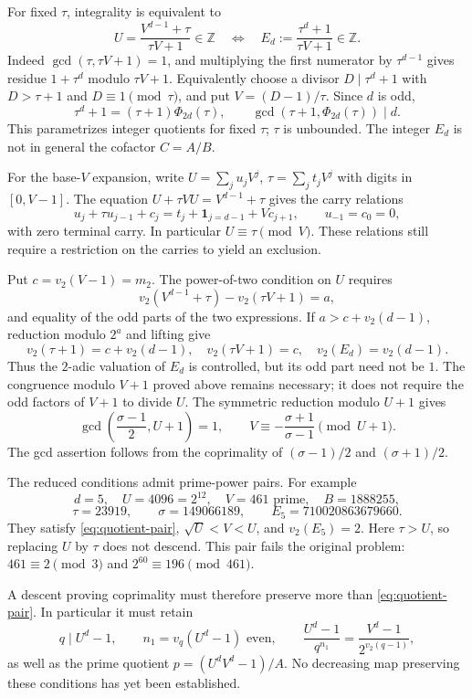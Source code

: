 \documentclass[11pt]{article}
\begin{document}
For fixed $\tau$, integrality is equivalent to
\begin{equation}\label{eq:quotient-divisor}
U=\frac{V^{d-1}+\tau}{\tau V+1}\in\mathbb Z
\quad\Longleftrightarrow\quad
E_d:=\frac{\tau^d+1}{\tau V+1}\in\mathbb Z.
\end{equation}
Indeed $\gcd(\tau,\tau V+1)=1$, and multiplying the first numerator
by $\tau^{d-1}$ gives residue $1+\tau^d$ modulo $\tau V+1$.
Equivalently choose a divisor $D\mid\tau^d+1$ with
$D>\tau+1$ and $D\equiv1\pmod\tau$, and put $V=(D-1)/\tau$.
Since $d$ is odd,
\[
\tau^d+1=(\tau+1)\Phi_{2d}(\tau),\qquad
\gcd(\tau+1,\Phi_{2d}(\tau))\mid d.
\]
This parametrizes integer quotients for fixed $\tau$; $\tau$ is unbounded.
The integer $E_d$ is not in general the cofactor $C=A/B$.

For the base-$V$ expansion, write
$U=\sum_j u_jV^j$, $\tau=\sum_j t_jV^j$ with digits in $[0,V-1]$.
The equation $U+\tau VU=V^{d-1}+\tau$ gives the carry relations
\[
u_j+\tau u_{j-1}+c_j=t_j+\mathbf1_{j=d-1}+Vc_{j+1},
\qquad u_{-1}=c_0=0,
\]
with zero terminal carry. In particular $U\equiv\tau\pmod V$.
These relations still require a restriction on the carries to yield an exclusion.

Put $c=v_2(V-1)=m_2$. The power-of-two condition on $U$ requires
\[
v_2(V^{d-1}+\tau)-v_2(\tau V+1)=a,
\]
and equality of the odd parts of the two expressions.
If $a>c+v_2(d-1)$, reduction modulo $2^a$ and lifting give
\[
v_2(\tau+1)=c+v_2(d-1),\quad
v_2(\tau V+1)=c,\quad v_2(E_d)=v_2(d-1).
\]
Thus the $2$-adic valuation of $E_d$ is controlled, but its odd part need
not be $1$. The congruence modulo $V+1$ proved above remains necessary;
it does not require the odd factors of $V+1$ to divide $U$.
The symmetric reduction modulo $U+1$ gives
\[
\gcd\left(\frac{\sigma-1}{2},U+1\right)=1,\qquad
V\equiv-\frac{\sigma+1}{\sigma-1}\pmod{U+1}.
\]
The gcd assertion follows from the coprimality of
$(\sigma-1)/2$ and $(\sigma+1)/2$.

The reduced conditions admit prime-power pairs. For example
\[
d=5,\quad U=4096=2^{12},\quad V=461\text{ prime},\quad
B=1888255,
\]
\[
\tau=23919,\qquad\sigma=149066189,\qquad
E_5=710020863679660.
\]
They satisfy \eqref{eq:quotient-pair}, $\sqrt U<V<U$, and
$v_2(E_5)=2$. Here $\tau>U$, so replacing $U$ by $\tau$ does not descend.
This pair fails the original problem: $461\equiv2\pmod3$ and
$2^{60}\equiv196\pmod{461}$.

A descent proving coprimality must therefore preserve more than
\eqref{eq:quotient-pair}. In particular it must retain
\[
q\mid U^d-1,\qquad n_1=v_q(U^d-1)\text{ even},\qquad
\frac{U^d-1}{q^{n_1}}=\frac{V^d-1}{2^{v_2(q-1)}},
\]
as well as the prime quotient $p=(U^dV^d-1)/A$.
No decreasing map preserving these conditions has yet been established.
\end{document}
